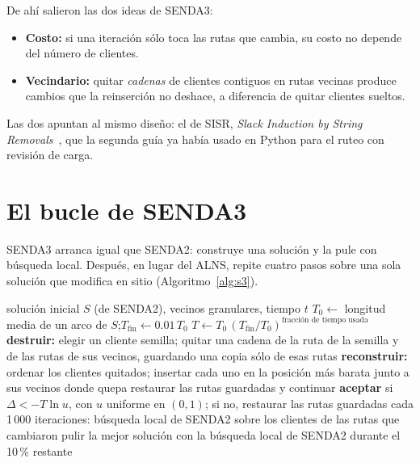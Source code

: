 \documentclass[11pt,a4paper]{article}
\newcommand{\sendados}{SENDA2}
\newcommand{\sendatres}{SENDA3}
\begin{document}
De ahí salieron las dos ideas de \sendatres:

\begin{itemize}[leftmargin=1.5em]
\item \textbf{Costo:} si una iteración sólo toca las rutas que cambia, su costo no depende del
número de clientes.
\item \textbf{Vecindario:} quitar \emph{cadenas} de clientes contiguos en rutas vecinas produce
cambios que la reinserción no deshace, a diferencia de quitar clientes sueltos.
\end{itemize}

Las dos apuntan al mismo diseño: el de SISR, \emph{Slack Induction by String
Removals}~\cite{christiaens2020}, que la segunda guía ya había usado en Python para el ruteo con
revisión de carga.

\section{El bucle de \sendatres}
\label{sec:bucle}

\sendatres{} arranca igual que \sendados: construye una solución y la pule con búsqueda local. Después,
en lugar del ALNS, repite cuatro pasos sobre una sola solución que modifica en sitio
(Algoritmo~\ref{alg:s3}).

\begin{algorithm}[H]
\caption{Bucle de \sendatres{} (esquema)}
\label{alg:s3}
\begin{algorithmic}[1]
\Require solución inicial $S$ (de \sendados), vecinos granulares, tiempo $t$
\State $T_0 \gets$ longitud media de un arco de $S$;\quad $T_{\text{fin}} \gets 0.01\,T_0$
  \State $T \gets T_0\,(T_{\text{fin}}/T_0)^{\text{fracción de tiempo usada}}$
  \State \textbf{destruir:} elegir un cliente semilla; quitar una cadena de la ruta de la semilla y de
         las rutas de sus vecinos, guardando una copia sólo de esas rutas
  \State \textbf{reconstruir:} ordenar los clientes quitados; insertar cada uno en la posición más
         barata junto a sus vecinos donde quepa
   restaurar las rutas guardadas y continuar \EndIf
  \State \textbf{aceptar} si $\Delta < -T\ln u$, con $u$ uniforme en $(0,1)$; si no, restaurar las rutas guardadas
  \State cada 1\,000 iteraciones: búsqueda local de \sendados{} sobre los clientes de las rutas que cambiaron
\EndWhile
\State pulir la mejor solución con la búsqueda local de \sendados{} durante el 10\,\% restante
\end{algorithmic}
\end{algorithm}
\end{document}
